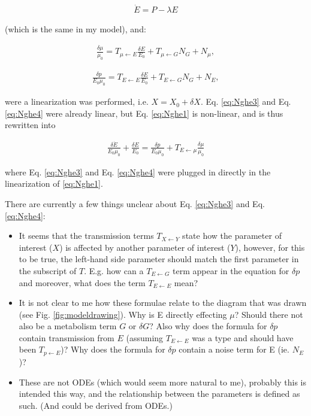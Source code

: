 \documentclass[a4paper,twoside,10pt]{report}
\begin{document}
\begin{align}
\label{eq:Nghe1}
\dot{E} = P - \lambda E
\end{align}

(which is the same in my model), and:

\begin{align}
\label{eq:Nghe3}
\frac{\delta\mu}{\mu_0} = T_{\mu \leftarrow E} \frac{\delta E}{E_0} + T_{\mu \leftarrow G} N_G + N_\mu
,
\end{align}

\begin{align}
\label{eq:Nghe4}
\frac{\delta{p}}{E_0 \mu_0} = T_{E \leftarrow E} \frac{\delta E}{E_0} + T_{E \leftarrow G} N_G + N_E
,
\end{align}

were a linearization was performed, i.e. $X=X_0+\delta X$. Eq. \ref{eq:Nghe3} and Eq. \ref{eq:Nghe4} were already linear, but Eq. \ref{eq:Nghe1} is non-linear, and is thus rewritten into

\begin{align}
\label{eq:Nghe5}
\frac{ \delta{\dot{E}} }{E_0 \mu_0} 
    + \frac{\delta E}{E_0} = \frac{\delta p}{E_0 \mu_0} + T_{E \leftarrow \mu} \frac{\delta \mu}{\mu_0}
\end{align}

where Eq. \ref{eq:Nghe3} and Eq. \ref{eq:Nghe4} were plugged in directly in the linearization of \ref{eq:Nghe1}.
%
{\color{red}
There are currently a few things unclear about Eq. \ref{eq:Nghe3} and Eq. \ref{eq:Nghe4}:
\begin{itemize}
\item It seems that the transmission terms $T_{X\leftarrow Y}$ state how the parameter of interest ($X$) is affected by another parameter of interest ($Y$), however, for this to be true, the left-hand side parameter should match the first parameter in the subscript of $T$. E.g. how can a $T_{E\leftarrow G}$ term appear in the equation for $\delta p$ and moreover, what does the term $T_{E \leftarrow E}$ mean?
\item It is not clear to me how these formulae relate to the diagram that was drawn (see Fig. \ref{fig:modeldrawing}). Why is E directly effecting $\mu$? Should there not also be a metabolism term $G$ or $\delta G$? Also why does the formula for $\delta p$ contain transmission from $E$ (assuming $T_{E\leftarrow E}$ was a type and should have been $T_{p\leftarrow E}$)? Why does the formula for $\delta p$ contain a noise term for E (ie. $N_E$)?
\item These are not ODEs (which would seem more natural to me), probably this is intended this way, and the relationship between the parameters is defined as such. (And could be derived from ODEs.)    
\end{itemize}
}
\end{document}
